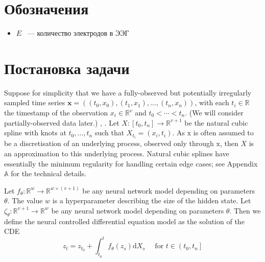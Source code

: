 \documentclass[12pt]{article}
\begin{document}
\section*{Обозначения}

\begin{itemize}
    \item $E$ ~--- количество электродов в ЭЭГ

\end{itemize}


\newpage
\section{Постановка задачи}

Suppose for simplicity that we have a fully-observed but potentially irregularly sampled time series $\mathbf{x}=\left(\left(t_{0}, x_{0}\right),\left(t_{1}, x_{1}\right), \ldots,\left(t_{n}, x_{n}\right)\right)$, with each $t_{i} \in \mathbb{R}$ the timestamp of the observation $x_{i} \in \mathbb{R}^{v}$
and $t_{0}<\cdots<t_{n}$. (We will consider partially-observed data later.)
\cite{neural_ode}, \cite{cde}. \cite{dda_ts}
Let $X:\left[t_{0}, t_{n}\right] \rightarrow \mathbb{R}^{v+1}$ be the natural cubic spline with knots at $t_{0}, \ldots, t_{n}$ such that $X_{t_{i}}=\left(x_{i}, t_{i}\right)$. As $\mathrm{x}$ is often assumed to be a discretisation of an underlying process, observed only through $\mathrm{x}$, then $X$ is an approximation to this underlying process. Natural cubic splines have essentially the minimum regularity for handling certain edge cases; see Appendix $\mathbb{A}$ for the technical details.

Let $f_{\theta}: \mathbb{R}^{w} \rightarrow \mathbb{R}^{w \times(v+1)}$ be any neural network model depending on parameters $\theta .$ The value $w$ is a hyperparameter describing the size of the hidden state. Let $\zeta_{\theta}: \mathbb{R}^{v+1} \rightarrow \mathbb{R}^{w}$ be any neural network model depending on parameters $\theta$.
Then we define the neural controlled differential equation model as the solution of the CDE
$$
z_{t}=z_{t_{0}}+\int_{t_{0}}^{t} f_{\theta}\left(z_{s}\right) \mathrm{d} X_{s} \quad \text { for } t \in\left(t_{0}, t_{n}\right]
$$


\end{document}
